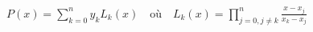 \documentclass[preview]{standalone}
\begin{document}
\begin{align*}
P(x) = \sum_{k=0}^{n} y_k L_k(x) \quad\text{o\`u}\quad L_k(x) = \prod_{j=0, j\neq k}^{n} \frac{x - x_j}{x_k - x_j}
\end{align*}
\end{document}
